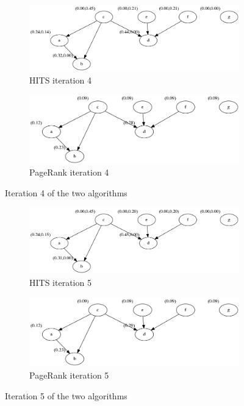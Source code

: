 \documentclass{article}
\begin{document}
	\begin{figure}[]
			\centering
			\begin{subfigure}{.5\textwidth}
			  \centering
			  \includegraphics[width=\linewidth]{HITS_it4.png}
			  \caption{HITS iteration 4}
			  \label{}
			\end{subfigure}%
			\begin{subfigure}{.5\textwidth}
			  \centering
			  \includegraphics[width=\linewidth]{PR_graph_iter_4.png}
			  \caption{PageRank iteration 4}
			  \label{}
			\end{subfigure}
			\caption{Iteration 4 of the two algorithms}
			\label{fig:PR_HITS_it4}
	\end{figure}
	\begin{figure}[]
			\centering
			\begin{subfigure}{.5\textwidth}
			  \centering
			  \includegraphics[width=\linewidth]{HITS_it5.png}
			  \caption{HITS iteration 5}
			  \label{}
			\end{subfigure}%
			\begin{subfigure}{.5\textwidth}
			  \centering
			  \includegraphics[width=\linewidth]{PR_graph_iter_5.png}
			  \caption{PageRank iteration 5}
			  \label{}
			\end{subfigure}
			\caption{Iteration 5 of the two algorithms}
			\label{fig:PR_HITS_it5}
	\end{figure}
\end{document}
